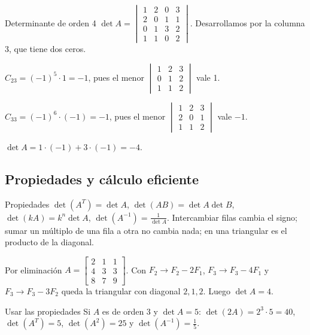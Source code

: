 \begin{tmejemplo}{Determinante de orden 4}
$\det A=\begin{vmatrix}1&2&0&3\\2&0&1&1\\0&1&3&2\\1&1&0&2\end{vmatrix}$. Desarrollamos por la columna 3, que tiene dos ceros.
\begin{tmpasos}
\item $C_{23}=(-1)^5\cdot1=-1$, pues el menor $\begin{vmatrix}1&2&3\\0&1&2\\1&1&2\end{vmatrix}$ vale 1.
\item $C_{33}=(-1)^6\cdot(-1)=-1$, pues el menor $\begin{vmatrix}1&2&3\\2&0&1\\1&1&2\end{vmatrix}$ vale $-1$.
\item $\det A=1\cdot(-1)+3\cdot(-1)=-4$.
\end{tmpasos}
\end{tmejemplo}

\subsection{Propiedades y c\'alculo eficiente}
\begin{tmdef}{Propiedades}
$\det(A^T)=\det A$, $\det(AB)=\det A\det B$, $\det(kA)=k^n\det A$, $\det(A^{-1})=\frac{1}{\det A}$. Intercambiar filas cambia el signo; sumar un m\'ultiplo de una fila a otra no cambia nada; en una triangular es el producto de la diagonal.
\end{tmdef}

\begin{tmejemplo}{Por eliminaci\'on}
$A=\begin{bmatrix}2&1&1\\4&3&3\\8&7&9\end{bmatrix}$. Con $F_2\to F_2-2F_1$, $F_3\to F_3-4F_1$ y $F_3\to F_3-3F_2$ queda la triangular con diagonal $2, 1, 2$. Luego $\det A=4$.
\end{tmejemplo}

\begin{tmejemplo}{Usar las propiedades}
Si $A$ es de orden 3 y $\det A=5$: $\det(2A)=2^3\cdot5=40$, $\det(A^T)=5$, $\det(A^2)=25$ y $\det(A^{-1})=\frac15$.
\end{tmejemplo}

